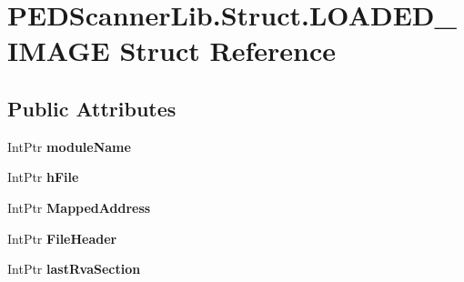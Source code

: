 \hypertarget{struct_p_e_d_scanner_lib_1_1_struct_1_1_l_o_a_d_e_d___i_m_a_g_e}{}\section{P\+E\+D\+Scanner\+Lib.\+Struct.\+L\+O\+A\+D\+E\+D\+\_\+\+I\+M\+A\+GE Struct Reference}
\label{struct_p_e_d_scanner_lib_1_1_struct_1_1_l_o_a_d_e_d___i_m_a_g_e}
\subsection*{Public Attributes}
\begin{DoxyCompactItemize}
\item 
\mbox{\label{struct_p_e_d_scanner_lib_1_1_struct_1_1_l_o_a_d_e_d___i_m_a_g_e_a0690fe627a98cb55be3f9a089eb2dc5b}} 
Int\+Ptr {\bfseries module\+Name}
\item 
\mbox{\label{struct_p_e_d_scanner_lib_1_1_struct_1_1_l_o_a_d_e_d___i_m_a_g_e_a318a872738142ed86ca5072df21418c8}} 
Int\+Ptr {\bfseries h\+File}
\item 
\mbox{\label{struct_p_e_d_scanner_lib_1_1_struct_1_1_l_o_a_d_e_d___i_m_a_g_e_acd98f03c4c6f4e3b3dc6ee873c046e3c}} 
Int\+Ptr {\bfseries Mapped\+Address}
\item 
\mbox{\label{struct_p_e_d_scanner_lib_1_1_struct_1_1_l_o_a_d_e_d___i_m_a_g_e_af4885f7e707ae785910014e133d1b48f}} 
Int\+Ptr {\bfseries File\+Header}
\item 
\mbox{\label{struct_p_e_d_scanner_lib_1_1_struct_1_1_l_o_a_d_e_d___i_m_a_g_e_a1dc0f5d821c8e9b164636a144cf43a99}} 
Int\+Ptr {\bfseries last\+Rva\+Section}
\item 
\mbox{\label{struct_p_e_d_scanner_lib_1_1_struct_1_1_l_o_a_d_e_d___i_m_a_g_e_a785be5a7f68c095810fb9115e8da60b4}} 

\end{DoxyCompactItemize}
